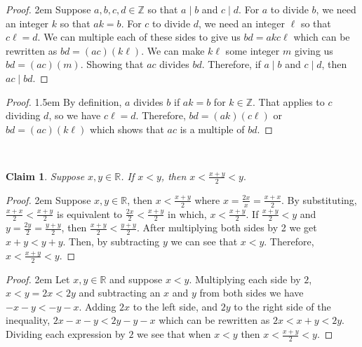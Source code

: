 \documentclass[12 pt]{article}
\newcommand{\R}{\mathbb{R}}
\newcommand{\Z}{\mathbb{Z}}
\newcommand{\ds}{\displaystyle}
\newcommand{\divides}{\! \mid \!}
\theoremstyle{definition}
\theoremstyle{plain}
\theoremstyle{mytheorem}
\newtheorem{claim}{Claim}
\theoremstyle{myexample}
\theoremstyle{mydefinition}
\begin{document}
\begin{proof} \openup 2em
Suppose $a,b,c,d \in \Z$ so that $a \divides b$ and $c \divides d$.  For $a$ to divide $b$, we need an integer $k$ so that $ak=b$.  For $c$ to divide $d$, we need an integer $\ell$ so that $c\ell=d$.  We can multiple each of these sides to give us $bd=akc\ell$ which can be rewritten as $bd=(ac)(k\ell)$.  We can make $k\ell$ some integer $m$ giving us $bd=(ac)(m)$.  Showing that $ac$ divides $bd$.  Therefore, if $a \divides b$ and $c \divides d$, then $ac \divides bd.$
\end{proof}
\begin{center} \underline{\hspace{\textwidth}} \end{center}
\begin{proof} \openup 1.5em
By definition, $a$ divides $b$ if $ak=b$ for $k \in \Z$.  That applies to $c$ dividing $d$, so we have $c\ell=d.$  Therefore, $bd=(ak)(c\ell)$ or $bd=(ac)(k\ell)$ which shows that $ac$ is a multiple of $bd$.
\end{proof}
\begin{center} \underline{\hspace{\textwidth}}\\ \underline{\hspace{\textwidth}} \end{center}
\begin{claim}  Suppose $x,y \in \R$.  If $x<y$, then $\ds x<\frac{x+y}{2} < y.$
\end{claim}

\begin{proof}  \openup 2em Suppose $x,y \in \R$, then $x<\frac{x+y}{2}$ where $x=\frac{2x}{x} = \frac{x+x}{2}$.  By substituting, $\frac{x+x}{2}<\frac{x+y}{2}$ is equivalent to $\frac{2x}{2}<\frac{x+y}{2}$ in which, $x< \frac{x+y}{2}.$  If $\frac{x+y}{2}<y$ and $y = \frac{2y}{2}=\frac{y+y}{2}$, then $\frac{x+y}{2}<\frac{y+y}{2}$.  After multiplying both sides by 2 we get $x+y<y+y$.  Then, by subtracting $y$ we can see that $x<y$.  Therefore, $x<\frac{x+y}{2}<y$.
\end{proof}
\begin{center} \underline{\hspace{\textwidth}} \end{center}
\begin{proof} \openup 2em
Let $x,y\in \R$ and suppose $x<y$.  Multiplying each side by $2$, $x<y = 2x<2y$ and subtracting an $x$ and $y$ from both sides we have $-x-y<-y-x$.  Adding $2x$ to the left side, and $2y$ to the right side of the inequality, $2x-x-y<2y-y-x$ which can be rewritten as $2x<x+y<2y$.  Dividing each expression by $2$ we see that when $x<y$ then $x< \frac{x+y}{2} < y$.
\end{proof}
\end{document}
